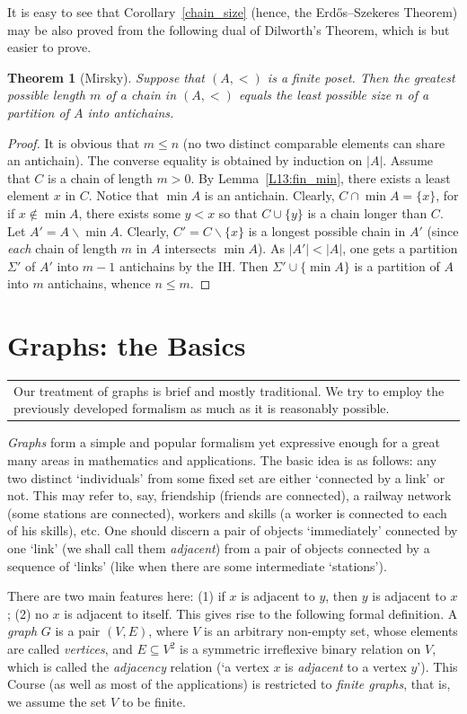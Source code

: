 \documentclass[12pt,notitlepage]{article}
\theoremstyle{plain}
\newtheorem{thm}{Theorem}[section]
\theoremstyle{definition}
\theoremstyle{plain}
\newcommand{\sbs}{\subseteq}
\renewcommand{\setminus}{\smallsetminus}
\newcommand{\1}{\mathbf{1}}
\newcommand{\0}{\mathbf{0}}
\newcommand{\mcomm}[1]{
\medskip\noindent\begin{tabular}{| l}
\parbox{0.99\textwidth}{{\small
#1 }}\end{tabular}
\smallskip}
\begin{document}
It is easy to see that Corollary~\ref{chain_size} (hence, the Erd\H{o}s--Szekeres Theorem) may be also proved from the following dual of Dilworth's Theorem, which is but easier to prove.

\begin{thm}[Mirsky]
Suppose that $(A, <)$ is a finite poset. Then the greatest possible length $m$ of a chain in $(A, <)$ equals the least possible size $n$ of a partition of $A$ into antichains.
\end{thm}
\begin{proof}
It is obvious that $m \leq n$ (no two distinct comparable elements can share an antichain). The converse equality is obtained by induction on $|A|$. Assume that $C$ is a chain of length $m > 0$. By Lemma~\ref{L13:fin_min}, there exists a least element $x$ in $C$. Notice that $\min A$ is an antichain. Clearly, $C \cap \min A = \{ x \}$, for if $x \notin \min A$, there exists some $y < x$ so that $C \cup \{y\}$ is a chain longer than $C$. Let $A' = A \setminus \min A$. Clearly, $C' = C \setminus \{x\}$ is a longest possible chain in $A'$ (since \emph{each} chain of length $m$ in $A$ intersects $\min A$). As $|A'| < |A|$, one gets a partition $\Sigma'$ of $A'$ into $m - 1$ antichains by the IH. Then $\Sigma' \cup \{ \min A \}$ is a partition of $A$ into $m$ antichains, whence $n \leq m$.
\end{proof}

\section{Graphs: the Basics}
\mcomm{Our treatment of graphs is brief and mostly traditional. We try to employ the previously developed formalism as much as it is reasonably possible.}

\emph{Graphs} form a simple and popular formalism yet expressive enough for a great many areas in mathematics and applications. The basic idea is as follows: any two distinct `individuals' from some fixed set are either `connected by a link' or not. This may refer to, say, friendship (friends are connected), a railway network (some stations are connected), workers and skills (a worker is connected to each of his skills), etc. One should discern a pair of objects `immediately' connected by one `link' (we shall call them \emph{adjacent}) from a pair of objects connected by a sequence of `links' (like when there are some intermediate `stations'). 

There are two main features here: (1) if $x$ is adjacent to $y$, then $y$ is adjacent to $x$; (2) no $x$ is adjacent to itself. This gives rise to the following formal definition. A \emph{graph} $G$ is a pair $(V, E)$, where $V$ is an arbitrary non-empty set, whose elements are called \emph{vertices}, and $E \sbs V^2$ is a symmetric irreflexive binary relation on $V$, which is called the \emph{adjacency} relation (`a vertex $x$ is \emph{adjacent} to a vertex $y$'). This Course (as well as most of the applications) is restricted to \emph{finite graphs}, that is, we assume the set $V$ to be finite.
\end{document}
